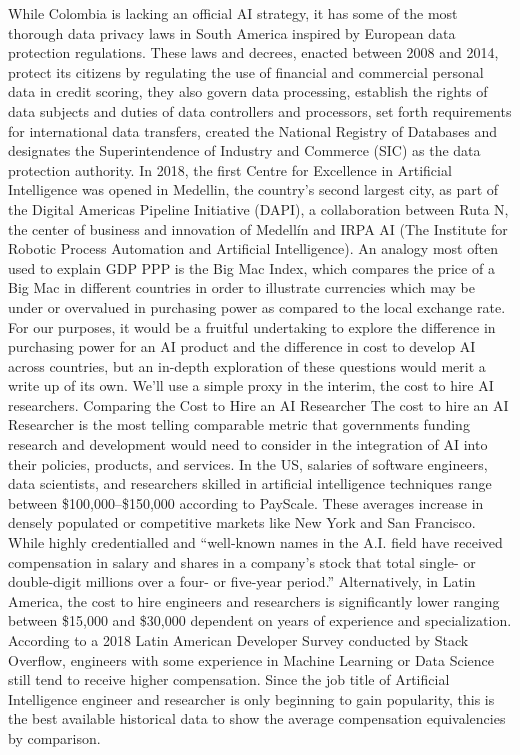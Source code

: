 \documentclass[journal]{IEEEtran}
\begin{document}
While Colombia is lacking an official AI strategy, it has some of the most thorough data privacy laws in South America inspired by European data protection regulations. These laws and decrees, enacted between 2008 and 2014, protect its citizens by regulating the use of financial and commercial personal data in credit scoring, they also govern data processing, establish the rights of data subjects and duties of data controllers and processors, set forth requirements for international data transfers, created the National Registry of Databases and designates the Superintendence of Industry and Commerce (SIC) as the data protection authority. In 2018, the first Centre for Excellence in Artificial Intelligence was opened in Medellin, the country’s second largest city, as part of the Digital Americas Pipeline Initiative (DAPI), a collaboration between Ruta N, the center of business and innovation of Medellín and IRPA AI (The Institute for Robotic Process Automation and Artificial Intelligence).
An analogy most often used to explain GDP PPP is the Big Mac Index, which compares the price of a Big Mac in different countries in order to illustrate currencies which may be under or overvalued in purchasing power as compared to the local exchange rate. For our purposes, it would be a fruitful undertaking to explore the difference in purchasing power for an AI product and the difference in cost to develop AI across countries, but an in-depth exploration of these questions would merit a write up of its own. We’ll use a simple proxy in the interim, the cost to hire AI researchers.
Comparing the Cost to Hire an AI Researcher
The cost to hire an AI Researcher is the most telling comparable metric that governments funding research and development would need to consider in the integration of AI into their policies, products, and services. In the US, salaries of software engineers, data scientists, and researchers skilled in artificial intelligence techniques range between \$100,000–\$150,000 according to PayScale. These averages increase in densely populated or competitive markets like New York and San Francisco. While highly credentialled and “well-known names in the A.I. field have received compensation in salary and shares in a company’s stock that total single- or double-digit millions over a four- or five-year period.”
Alternatively, in Latin America, the cost to hire engineers and researchers is significantly lower ranging between \$15,000 and \$30,000 dependent on years of experience and specialization. According to a 2018 Latin American Developer Survey conducted by Stack Overflow, engineers with some experience in Machine Learning or Data Science still tend to receive higher compensation. Since the job title of Artificial Intelligence engineer and researcher is only beginning to gain popularity, this is the best available historical data to show the average compensation equivalencies by comparison.
\end{document}
